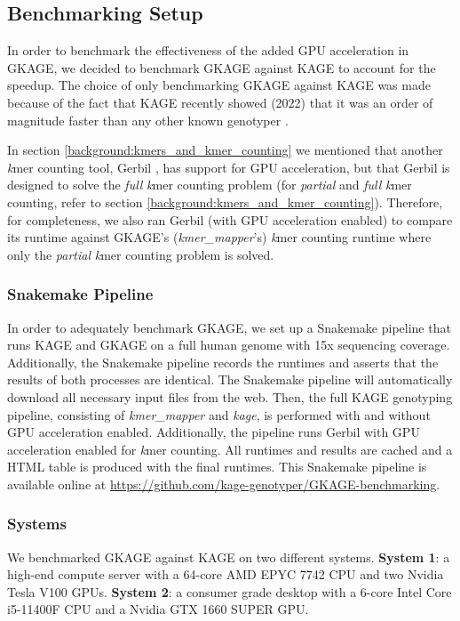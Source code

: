 \subsection{Benchmarking Setup} \label{methods:benchmarking_setup}
In order to benchmark the effectiveness of the added GPU acceleration in GKAGE, we decided to benchmark GKAGE against KAGE to account for the speedup.
The choice of only benchmarking GKAGE against KAGE was made because of the fact that KAGE recently showed (2022) that it was an order of magnitude faster than any other known genotyper \cite{kage}.

In section \ref{background:kmers_and_kmer_counting} we mentioned that another \textit{k}mer counting tool, Gerbil \cite{gerbil}, has support for GPU acceleration, but that Gerbil is designed to solve the \textit{full} \textit{k}mer counting problem (for \textit{partial} and \textit{full} \textit{k}mer counting, refer to section \ref{background:kmers_and_kmer_counting}).
Therefore, for completeness, we also ran Gerbil (with GPU acceleration enabled) to compare its runtime against GKAGE's (\textit{kmer\_mapper}'s) \textit{k}mer counting runtime where only the \textit{partial} \textit{k}mer counting problem is solved.

\subsubsection{Snakemake Pipeline} \label{methods:benchmarking_setup:snakemake_pipeline}
In order to adequately benchmark GKAGE, we set up a Snakemake pipeline that runs KAGE and GKAGE on a full human genome with 15x sequencing coverage. 
Additionally, the Snakemake pipeline records the runtimes and asserts that the results of both processes are identical.
The Snakemake pipeline will automatically download all necessary input files from the web. 
Then, the full KAGE genotyping pipeline, consisting of \textit{kmer\_mapper} and \textit{kage}, is performed with and without GPU acceleration enabled.
Additionally, the pipeline runs Gerbil with GPU acceleration enabled for \textit{k}mer counting.
All runtimes and results are cached and a HTML table is produced with the final runtimes.
This Snakemake pipeline is available online at \url{https://github.com/kage-genotyper/GKAGE-benchmarking}.

\subsubsection{Systems} \label{methods:benchmarking_setup:systems}
We benchmarked GKAGE against KAGE on two different systems.
\textbf{System 1}: a high-end compute server with a 64-core AMD EPYC 7742 CPU and two Nvidia Tesla V100 GPUs.
\textbf{System 2}: a consumer grade desktop with a 6-core Intel Core i5-11400F CPU and a Nvidia GTX 1660 SUPER GPU.

